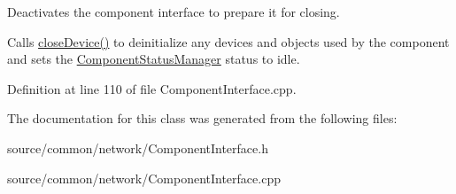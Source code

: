 Deactivates the component interface to prepare it for closing. 

Calls \hyperlink{class_component_interface_ab4433362fe7d1e5c09dc556e7105f775}{close\-Device()} to deinitialize any devices and objects used by the component and sets the \hyperlink{class_component_status_manager}{Component\-Status\-Manager} status to idle. 

Definition at line 110 of file Component\-Interface.\-cpp.



The documentation for this class was generated from the following files\-:\begin{DoxyCompactItemize}
\item 
source/common/network/Component\-Interface.\-h\item 
source/common/network/Component\-Interface.\-cpp\end{DoxyCompactItemize}
